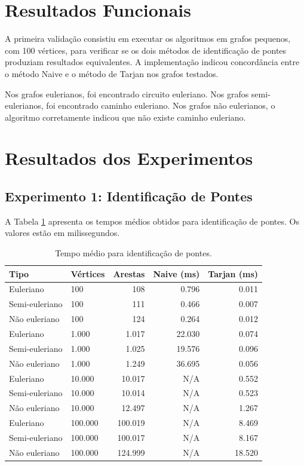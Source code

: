 \documentclass[a4paper,12pt]{article}
\begin{document}
\section{Resultados Funcionais}

A primeira validação consistiu em executar os algoritmos em grafos pequenos, com 100 vértices, para verificar se os dois métodos de identificação de pontes produziam resultados equivalentes. A implementação indicou concordância entre o método Naive e o método de Tarjan nos grafos testados.

Nos grafos eulerianos, foi encontrado circuito euleriano. Nos grafos semi-eulerianos, foi encontrado caminho euleriano. Nos grafos não eulerianos, o algoritmo corretamente indicou que não existe caminho euleriano.

\section{Resultados dos Experimentos}

\subsection{Experimento 1: Identificação de Pontes}

A Tabela \ref{tab:pontes} apresenta os tempos médios obtidos para identificação de pontes. Os valores estão em milissegundos.

\begin{table}[H]
\centering
\caption{Tempo médio para identificação de pontes.}
\label{tab:pontes}
\begin{tabular}{llrrr}
\toprule
Tipo & Vértices & Arestas & Naive (ms) & Tarjan (ms) \\
\midrule
Euleriano & 100 & 108 & 0.796 & 0.011 \\
Semi-euleriano & 100 & 111 & 0.466 & 0.007 \\
Não euleriano & 100 & 124 & 0.264 & 0.012 \\
Euleriano & 1.000 & 1.017 & 22.030 & 0.074 \\
Semi-euleriano & 1.000 & 1.025 & 19.576 & 0.096 \\
Não euleriano & 1.000 & 1.249 & 36.695 & 0.056 \\
Euleriano & 10.000 & 10.017 & N/A & 0.552 \\
Semi-euleriano & 10.000 & 10.014 & N/A & 0.523 \\
Não euleriano & 10.000 & 12.497 & N/A & 1.267 \\
Euleriano & 100.000 & 100.019 & N/A & 8.469 \\
Semi-euleriano & 100.000 & 100.017 & N/A & 8.167 \\
Não euleriano & 100.000 & 124.999 & N/A & 18.520 \\
\bottomrule
\end{tabular}
\end{table}
\end{document}
